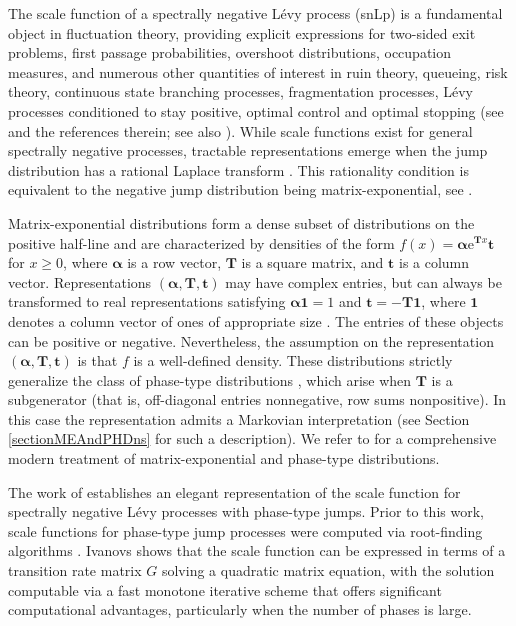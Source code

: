 \documentclass[a4paper,11pt]{article}
\newcommand{\correction}[1]{{\textcolor{blue}{#1}}}
\numberwithin{equation}{section}
\theoremstyle{plain}
\theoremstyle{definition}
\newcommand{\1}{\mathbf{1}}
\newcommand{\e}{\mathrm{e}}
\begin{document}
The scale function of a spectrally negative Lévy process (snLp) is a fundamental object in fluctuation theory, providing explicit expressions for two-sided exit problems, first passage probabilities, overshoot distributions, occupation measures, and numerous other quantities of interest in ruin theory, queueing, risk theory, continuous state branching processes, fragmentation processes, L\'evy processes conditioned to stay positive, optimal control and optimal stopping (see  \citep{KuznetsovKyprianouRivero2013} and the references therein; see also \cite{AvramPalmowskiPistorius2007,MR1988433,MR2023021,MR1175272,MR1053243,MR410961,MR2164035}). 
While scale functions exist for general spectrally negative processes, tractable representations emerge when the jump distribution has a rational Laplace transform \cite{lewis2008wiener,KuznetsovKyprianouRivero2013}. This rationality condition is equivalent to the negative jump distribution being matrix-exponential, see \cite[Theorem 4.1.10]{BladtNielsen2017}.

Matrix-exponential distributions \citep{Cox1955} form a dense subset of distributions on the positive half-line and are characterized by densities of the form $f(x) = \bm{\alpha} \e^{\bm{T}x} \bm{t}$ for $x \ge 0$, where $\bm{\alpha}$ is a row vector, $\bm{T}$ is a square matrix, and $\bm{t}$ is a column vector. 
Representations $(\bm{\alpha}, \bm{T}, \bm{t})$ may have complex entries, but can always be transformed to real representations satisfying $\bm{\alpha}\bm{1} = 1$ and $\bm{t} = -\bm{T}\bm{1}$, where $\bm{1}$ denotes a column vector of ones of appropriate size \citep{asmussen1996renewal}.
The entries of these objects can be positive or negative. 
Nevertheless, the assumption on the  representation $(\bm{\alpha}, \bm{T}, \bm{t})$ is that $f$ is a well-defined density.
These distributions strictly generalize the class of phase-type distributions \citep{Neuts1981}, which arise when $\bm{T}$ is a subgenerator (that is, off-diagonal entries nonnegative, row sums nonpositive). In this case the representation admits a Markovian interpretation (see Section \ref{sectionMEAndPHDns} for such a description). We refer to \cite{BladtNielsen2017} for a comprehensive modern treatment of matrix-exponential and phase-type distributions.

The work of \cite{Ivanovs2021} establishes an elegant representation of the scale function for spectrally negative Lévy processes with phase-type jumps. Prior to this work, scale functions for phase-type jump processes were computed via root-finding algorithms \citep{asmussen2004russian,pistorius2006maxima,egami2014phase,asmussen2014levy}. Ivanovs shows that the scale function can be expressed in terms of a transition rate matrix $G$ solving a quadratic matrix equation, with the solution computable via a fast monotone iterative scheme that offers significant computational advantages, particularly when the number of phases is large.
\end{document}
